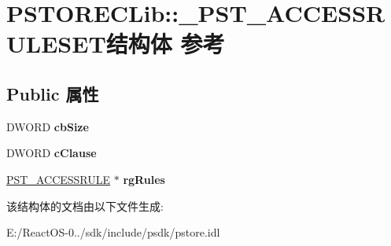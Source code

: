 \hypertarget{struct_p_s_t_o_r_e_c_lib_1_1___p_s_t___a_c_c_e_s_s_r_u_l_e_s_e_t}{}\section{P\+S\+T\+O\+R\+E\+C\+Lib\+:\+:\+\_\+\+P\+S\+T\+\_\+\+A\+C\+C\+E\+S\+S\+R\+U\+L\+E\+S\+E\+T结构体 参考}
\label{struct_p_s_t_o_r_e_c_lib_1_1___p_s_t___a_c_c_e_s_s_r_u_l_e_s_e_t}
\subsection*{Public 属性}
\begin{DoxyCompactItemize}
\item 
\mbox{\label{struct_p_s_t_o_r_e_c_lib_1_1___p_s_t___a_c_c_e_s_s_r_u_l_e_s_e_t_ac03528ec10d1510ba33ae8c14678f54d}} 
D\+W\+O\+RD {\bfseries cb\+Size}
\item 
\mbox{\label{struct_p_s_t_o_r_e_c_lib_1_1___p_s_t___a_c_c_e_s_s_r_u_l_e_s_e_t_a96c5e0cf24707f25ede3537fe7fb1141}} 
D\+W\+O\+RD {\bfseries c\+Clause}
\item 
\mbox{\label{struct_p_s_t_o_r_e_c_lib_1_1___p_s_t___a_c_c_e_s_s_r_u_l_e_s_e_t_ac946eb8c6f843d1b8d0e57207c854a8c}} 
\hyperlink{struct_p_s_t_o_r_e_c_lib_1_1___p_s_t___a_c_c_e_s_s_r_u_l_e}{P\+S\+T\+\_\+\+A\+C\+C\+E\+S\+S\+R\+U\+LE} $\ast$ {\bfseries rg\+Rules}
\end{DoxyCompactItemize}


该结构体的文档由以下文件生成\+:\begin{DoxyCompactItemize}
\item 
E\+:/\+React\+O\+S-\/0../sdk/include/psdk/pstore.\+idl\end{DoxyCompactItemize}
